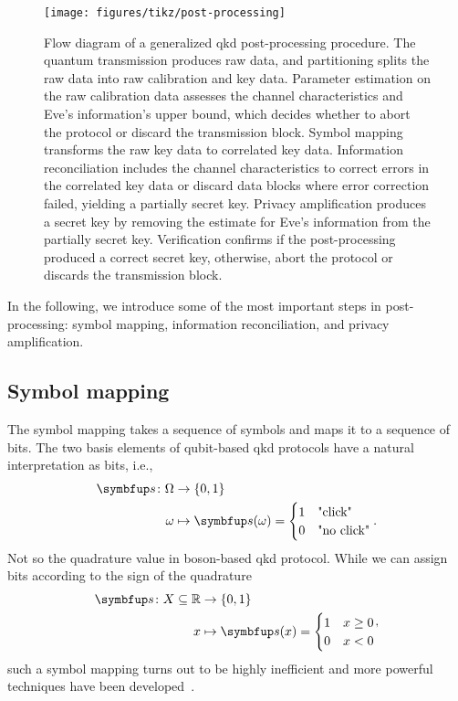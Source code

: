 \begin{figure}[htb]
	\centering
	\texttt{[image: figures/tikz/post-processing]}
	\caption{Flow diagram of a generalized \gls{qkd} post-processing procedure. The quantum transmission produces raw data, and partitioning splits the raw data into raw calibration and key data. Parameter estimation on the raw calibration data assesses the channel characteristics and Eve's information's upper bound, which decides whether to abort the protocol or discard the transmission block. Symbol mapping transforms the raw key data to correlated key data. Information reconciliation includes the channel characteristics to correct errors in the correlated key data or discard data blocks where error correction failed, yielding a partially secret key. Privacy amplification produces a secret key by removing the estimate for Eve's information from the partially secret key. Verification confirms if the post-processing produced a correct secret key, otherwise, abort the protocol or discards the transmission block.}\label{fig:post_processing}
\end{figure}
In the following, we introduce some of the most important steps in post-processing: symbol mapping, information reconciliation, and privacy amplification.

\FloatBarrier
\subsection{Symbol mapping}

The symbol mapping takes a sequence of symbols and maps it to a sequence of bits.
The two basis elements of qubit-based \gls{qkd} protocols have a natural interpretation as bits, i.e.,
\begin{equation}
	\begin{split}
		\vb{s}\colon\Omega&\to\{0,1\} \\
		\omega &\mapsto \vb{s}(\omega)
		=
		\begin{cases}
			1 & \text{"click"} \\
			0 & \text{"no click"}
		\end{cases}
		.
	\end{split}
\end{equation}
Not so the quadrature value in boson-based \gls{qkd} protocol.
While we can assign bits according to the sign of the quadrature
\begin{equation}
	\begin{split}
		\vb{s}\colon X\subseteq\mathbb{R}&\to\{0,1\} \\
		x &\mapsto \vb{s}(x)
		=
		\begin{cases}
			1 & x\geq0 \\
			0 & x<0
		\end{cases}
	\end{split}
	,
\end{equation}
such a symbol mapping turns out to be highly inefficient and more powerful techniques have been developed~\cite{VanAsche2004,Leverrier2008}.

